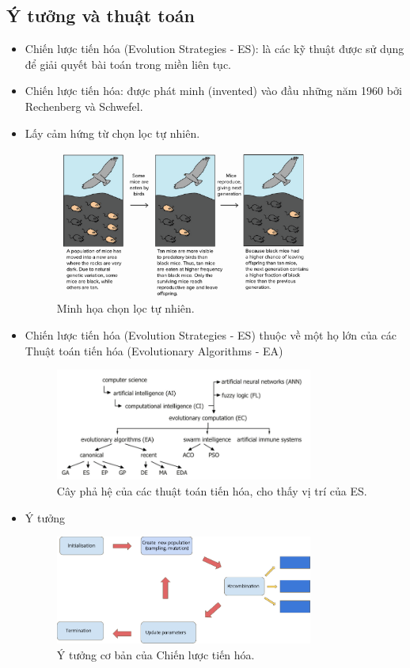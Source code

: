 \documentclass{book}
\begin{document}
\subsection{Ý tưởng và thuật toán}
\begin{itemize}
    \item Chiến lược tiến hóa (Evolution Strategies - ES): là các kỹ thuật được sử dụng để giải quyết bài toán trong miền liên tục.
    \item Chiến lược tiến hóa: được phát minh (invented) vào đầu những năm 1960 bởi Rechenberg và Schwefel.
    \item Lấy cảm hứng từ chọn lọc tự nhiên.
    \begin{figure}[H]
        \centering
        \includegraphics[width=0.8\textwidth]{images/natural_selection.png}
        \caption{Minh họa chọn lọc tự nhiên.}
    \end{figure}
    \item Chiến lược tiến hóa (Evolution Strategies - ES) thuộc về một họ lớn của các Thuật toán tiến hóa (Evolutionary Algorithms - EA)
    \begin{figure}[H]
        \centering
        \includegraphics[width=0.8\textwidth]{images/family_tree_es.png}
        \caption{Cây phả hệ của các thuật toán tiến hóa, cho thấy vị trí của ES.}
    \end{figure}
    \item Ý tưởng
    \begin{figure}[H]
        \centering
        \includegraphics[width=0.8\textwidth]{images/basic_idea_es.png}
        \caption{Ý tưởng cơ bản của Chiến lược tiến hóa.}
    \end{figure}
\end{itemize}
\end{document}
